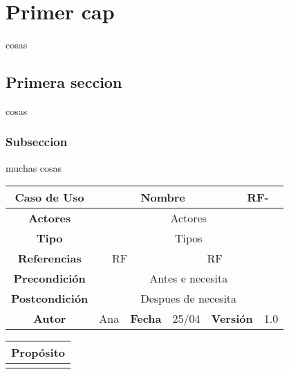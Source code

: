
\chapter{Primer cap}


cosas


\section{Primera seccion}


cosas


\subsection{Subseccion}


muchas cosas

\begin{table}[!h]
\begin{tabular}{|c|c|c|c|c|c|c|c|}
\hline
\textbf{Caso de Uso} & \multicolumn{5}{|c|}{Nombre} & \multicolumn{2}{|c|}{RF-} \\
\hline
\textbf{Actores}              & \multicolumn{7}{|c|}{Actores}           \\
\hline
\textbf{Tipo}                 & \multicolumn{7}{|c|}{Tipos}             \\
\hline
\textbf{Referencias}          & \multicolumn{2}{|c|}{RF}           & \multicolumn{5}{|c|}{RF}\\
\hline
\textbf{Precondición}         & \multicolumn{7}{|c|}{Antes e necesita}             \\
\hline
\textbf{Postcondición}        & \multicolumn{7}{|c|}{Despues de necesita}              \\
\hline
\textbf{Autor}                &   Ana   & \multicolumn{2}{|c|}{\textbf{Fecha}} &  25/04   & \multicolumn{2}{|c|}{\textbf{Versión}} & 1.0  \\
\hline
\end{tabular}
\end{table}

\begin{table}[!h]
\begin{tabular}{|c|}
\hline
\textbf{Propósito} \\
\hline
                   \\
\hline
\end{tabular}
\end{table}


